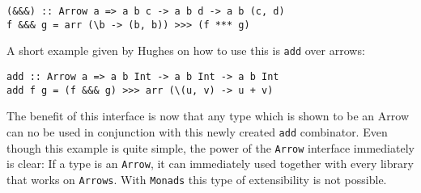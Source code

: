 \begin{lstlisting}[frame=htrbl]
(&&&) :: Arrow a => a b c -> a b d -> a b (c, d)
f &&& g = arr (\b -> (b, b)) >>> (f *** g)
\end{lstlisting}
A short example given by Hughes on how to use this is \lstinline{add} over arrows:
\begin{lstlisting}[frame=htrbl, caption={add over Arrows}]
add :: Arrow a => a b Int -> a b Int -> a b Int
add f g = (f &&& g) >>> arr (\(u, v) -> u + v)
\end{lstlisting}
The benefit of this interface is now that any type which is shown to be an Arrow can no be used in conjunction with this newly created \lstinline{add} combinator. Even though this example is quite simple, the power of the \lstinline{Arrow} interface immediately is clear: If a type is an \lstinline{Arrow}, it can immediately used together with every library that works on \lstinline{Arrows}. With \lstinline{Monads} this type of extensibility is not possible.